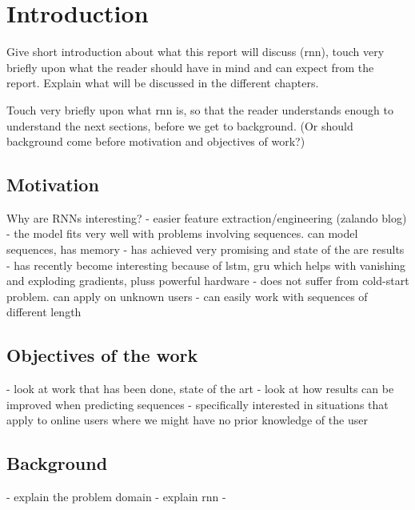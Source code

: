 \chapter{Introduction}
Give short introduction about what this report will discuss (rnn), touch very briefly upon what the reader should have in mind and can expect from the report. Explain what will be discussed in the different chapters.

Touch very briefly upon what rnn is, so that the reader understands enough to understand the next sections, before we get to background. (Or should background come before motivation and objectives of work?)


\section{Motivation}
Why are RNNs interesting?
- easier feature extraction/engineering (zalando blog)
- the model fits very well with problems involving sequences. can model sequences, has memory
- has achieved very promising and state of the are results 
- has recently become interesting because of lstm, gru which helps with vanishing and exploding gradients, pluss powerful hardware
- does not suffer from cold-start problem. can apply on unknown users
- can easily work with sequences of different length

\section{Objectives of the work}
- look at work that has been done, state of the art
- look at how results can be improved when predicting sequences
- specifically interested in situations that apply to online users where we might have no prior knowledge of the user

\section{Background}
- explain the problem domain
- explain rnn
- 